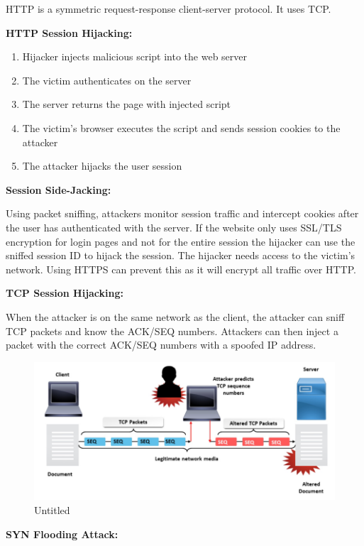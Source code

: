 \documentclass[]{article}
\begin{document}
HTTP is a symmetric request-response client-server protocol. It uses
TCP.

\textbf{HTTP Session Hijacking:}

\begin{enumerate}
\def\labelenumi{\arabic{enumi}.}
\item
  Hijacker injects malicious script into the web server
\item
  The victim authenticates on the server
\item
  The server returns the page with injected script
\item
  The victim's browser executes the script and sends session cookies to
  the attacker
\item
  The attacker hijacks the user session
\end{enumerate}

\textbf{Session Side-Jacking:}

Using packet sniffing, attackers monitor session traffic and intercept
cookies after the user has authenticated with the server. If the website
only uses SSL/TLS encryption for login pages and not for the entire
session the hijacker can use the sniffed session ID to hijack the
session. The hijacker needs access to the victim's network. Using HTTPS
can prevent this as it will encrypt all traffic over HTTP.

\textbf{TCP Session Hijacking:}

When the attacker is on the same network as the client, the attacker can
sniff TCP packets and know the ACK/SEQ numbers. Attackers can then
inject a packet with the correct ACK/SEQ numbers with a spoofed IP
address.

\begin{figure}
\centering
\includegraphics{./tex2pdf.-328d711c/36ac2e7821c194b1d375d23d12f30d45036e7277.png}
\caption{Untitled}
\end{figure}

\textbf{SYN Flooding Attack:}
\end{document}
